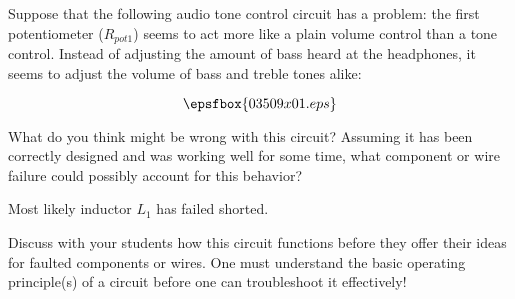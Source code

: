 

Suppose that the following audio tone control circuit has a problem: the first potentiometer ($R_{pot1}$) seems to act more like a plain volume control than a tone control.  Instead of adjusting the amount of bass heard at the headphones, it seems to adjust the volume of bass and treble tones alike:

$$\epsfbox{03509x01.eps}$$

What do you think might be wrong with this circuit?  Assuming it has been correctly designed and was working well for some time, what component or wire failure could possibly account for this behavior?







Most likely inductor $L_1$ has failed shorted.







Discuss with your students how this circuit functions before they offer their ideas for faulted components or wires.  One must understand the basic operating principle(s) of a circuit before one can troubleshoot it effectively!





